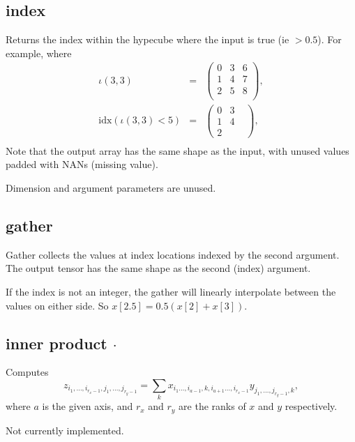 \subsection{index}\label{Operation:index}

Returns the index within the hypecube where the input is true (ie
$>0.5$). For example, where
\begin{eqnarray*}
  \iota(3,3) &=& \left(\begin{array}{ccc}
  0 & 3 & 6 \\
  1 & 4 & 7 \\
  2 & 5 & 8 \\
  \end{array}\right),\\
  \mathrm{idx}(\iota(3,3)<5) &=&
  \left(\begin{array}{ccc}
    0 & 3 &\\
    1 & 4 &\\
    2 & &
  \end{array}\right),\\
\end{eqnarray*}
Note that the output array has the same shape as the input, with
unused values padded with NANs (missing value).

Dimension and argument parameters are unused.


\subsection{gather}\label{Operation:gather}

Gather collects the values at index locations indexed by the second
argument. The output tensor has the same shape as the second (index)
argument.

If the index is not an integer, the gather will linearly interpolate between
the values on either side. So $x[2.5] = 0.5 (x[2]+x[3])$.

\subsection{inner product $\cdot$}\label{Operation:innerProduct}
Computes
\begin{displaymath}
z_{i_1,\ldots,i_{r_x-1},j_1,\ldots,j_{r_y-1}} =
\sum_k x_{i_1\ldots,i_{a-1},k,i_{a+1}\ldots,i_{r_x-1}}
y_{j_1,\ldots,j_{r_y-1},k},
\end{displaymath}
where $a$ is the given axis, and $r_x$ and $r_y$ are the ranks of $x$ and $y$ respectively.

Not currently implemented.

